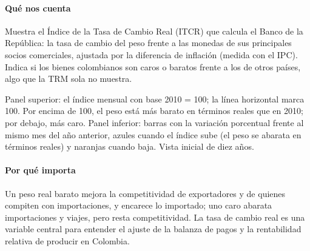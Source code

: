 \paragraph{Qué nos cuenta}
Muestra el Índice de la Tasa de Cambio Real (ITCR) que calcula el Banco de la República: la tasa de cambio del peso frente a las monedas de sus principales socios comerciales, ajustada por la diferencia de inflación (medida con el IPC). Indica si los bienes colombianos son caros o baratos frente a los de otros países, algo que la TRM sola no muestra.

\begin{leer}
Panel superior: el índice mensual con base 2010 = 100; la línea horizontal marca 100. Por encima de 100, el peso está más barato en términos reales que en 2010; por debajo, más caro. Panel inferior: barras con la variación porcentual frente al mismo mes del año anterior, azules cuando el índice sube (el peso se abarata en términos reales) y naranjas cuando baja. Vista inicial de diez años.
\end{leer}

\paragraph{Por qué importa}
Un peso real barato mejora la competitividad de exportadores y de quienes compiten con importaciones, y encarece lo importado; uno caro abarata importaciones y viajes, pero resta competitividad. La tasa de cambio real es una variable central para entender el ajuste de la balanza de pagos y la rentabilidad relativa de producir en Colombia.

